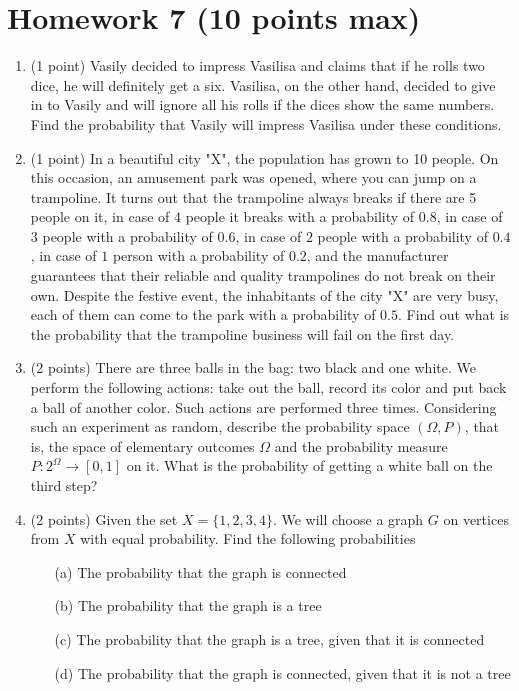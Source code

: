 \documentclass{article}
\begin{document}
\section*{Homework 7 (10 points max)}

\begin{enumerate}
  \item (1 point) Vasily decided to impress Vasilisa and claims 
  that if he rolls two dice, he will definitely get a six. 
  Vasilisa, on the other hand, decided to give in to Vasily and 
  will ignore all his rolls if the dices show the same numbers. 
  Find the probability that Vasily will impress Vasilisa 
  under these conditions.

  \item (1 point) In a beautiful city "X", the population has grown 
  to 10 people. On this occasion, an amusement park was opened, 
  where you can jump on a trampoline. It turns out that the trampoline 
  always breaks if there are 5 people on it, in case of $4$ people 
  it breaks with a probability of $0.8$, in case of $3$ people with 
  a probability of $0.6$, in case of $2$ people with a probability 
  of $0.4$, in case of $1$ person with a probability of $0.2$, and 
  the manufacturer guarantees that their reliable and quality 
  trampolines do not break on their own. 
  Despite the festive event, the inhabitants of the city "X" are very busy, 
  each of them can come to the park with a probability of $0.5$. 
  Find out what is the probability that the trampoline business 
  will fail on the first day.
  
  \item (2 points) There are three balls in the bag: two black and 
  one white. We perform the following actions: take out the ball, 
  record its color and put back a ball of another color. 
  Such actions are performed three times. Considering such 
  an experiment as random, describe the probability space $(\Omega, P)$, 
  that is, the space of elementary outcomes $\Omega$ and 
  the probability measure $P: 2^{\Omega} \rightarrow [0, 1]$ on it. 
  What is the probability of getting a white ball on the third step?
  
  \item (2 points) Given the set $X = \{1, 2, 3, 4\}$. We will choose 
  a graph $G$ on vertices from $X$ with equal probability. 
  Find the following probabilities
  \begin{itemize}
    \item[(a)] The probability that the graph is connected
    \item[(b)] The probability that the graph is a tree
    \item[(c)] The probability that the graph is a tree, 
    given that it is connected
    \item[(d)] The probability that the graph is connected, 
    given that it is not a tree
  \end{itemize}
  

\end{enumerate}
\end{document}
